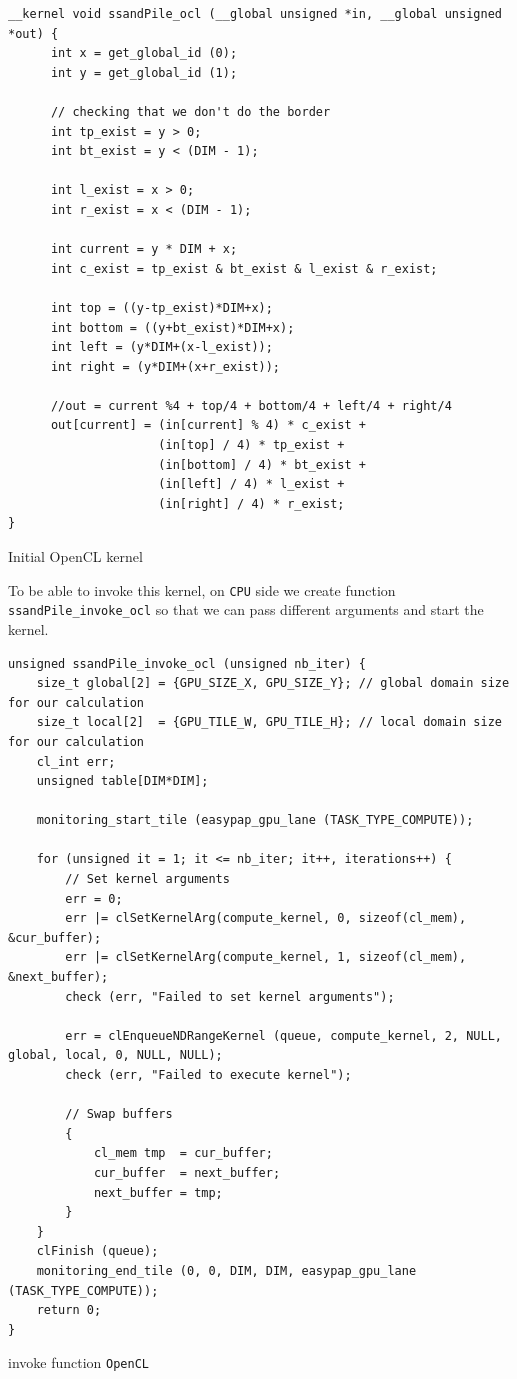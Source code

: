 \documentclass{report}
\def\openCL{\texttt{OpenCL}}
\def\CPU{\texttt{CPU}}
\begin{document}
\begin{listing}[H]
	\begin{verbatim}
__kernel void ssandPile_ocl (__global unsigned *in, __global unsigned *out) {
      int x = get_global_id (0);
      int y = get_global_id (1);

      // checking that we don't do the border
      int tp_exist = y > 0;
      int bt_exist = y < (DIM - 1);

      int l_exist = x > 0;
      int r_exist = x < (DIM - 1);

      int current = y * DIM + x;
      int c_exist = tp_exist & bt_exist & l_exist & r_exist;  

      int top = ((y-tp_exist)*DIM+x);
      int bottom = ((y+bt_exist)*DIM+x);
      int left = (y*DIM+(x-l_exist));
      int right = (y*DIM+(x+r_exist));

      //out = current %4 + top/4 + bottom/4 + left/4 + right/4 
      out[current] = (in[current] % 4) * c_exist +
                     (in[top] / 4) * tp_exist + 
                     (in[bottom] / 4) * bt_exist + 
                     (in[left] / 4) * l_exist + 
                     (in[right] / 4) * r_exist;
}
\end{verbatim}
	\caption{Initial OpenCL kernel}
\end{listing}

To be able to invoke this kernel, on \CPU{} side we create function \texttt{ssandPile\_invoke\_ocl}
so that we can pass different arguments and start the kernel.

\begin{listing}[H]
	\begin{verbatim}
unsigned ssandPile_invoke_ocl (unsigned nb_iter) {
    size_t global[2] = {GPU_SIZE_X, GPU_SIZE_Y}; // global domain size for our calculation
    size_t local[2]  = {GPU_TILE_W, GPU_TILE_H}; // local domain size for our calculation
    cl_int err;
    unsigned table[DIM*DIM];

    monitoring_start_tile (easypap_gpu_lane (TASK_TYPE_COMPUTE));

    for (unsigned it = 1; it <= nb_iter; it++, iterations++) {
        // Set kernel arguments
        err = 0;
        err |= clSetKernelArg(compute_kernel, 0, sizeof(cl_mem), &cur_buffer);
        err |= clSetKernelArg(compute_kernel, 1, sizeof(cl_mem), &next_buffer);
        check (err, "Failed to set kernel arguments");

        err = clEnqueueNDRangeKernel (queue, compute_kernel, 2, NULL, global, local, 0, NULL, NULL);
        check (err, "Failed to execute kernel");

        // Swap buffers
        {
            cl_mem tmp  = cur_buffer;
            cur_buffer  = next_buffer;
            next_buffer = tmp;
        }
    }
    clFinish (queue);
    monitoring_end_tile (0, 0, DIM, DIM, easypap_gpu_lane (TASK_TYPE_COMPUTE));
    return 0;
}
\end{verbatim}
	\caption{invoke function \openCL{}}
\end{listing}
\end{document}
